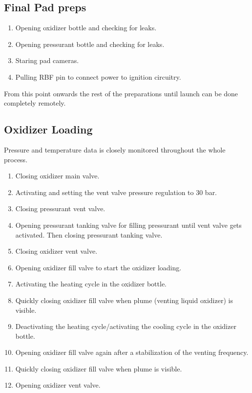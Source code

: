\subsection{Final Pad preps}
\begin{enumerate}
\item Opening oxidizer bottle and checking for leaks.
\item Opening pressurant bottle and checking for leaks.
\item Staring pad cameras.
\item Pulling RBF pin to connect power to ignition circuitry.
\end{enumerate}

From this point onwards the rest of the preparations until launch can be done completely remotely. 

\subsection{Oxidizer Loading}
\label{sec:oxidizer_loading}
Pressure and temperature data is closely monitored throughout the whole process.
\begin{enumerate}
\item Closing oxidizer main valve.
\item Activating and setting the vent valve pressure regulation to 30 bar.
\item Closing pressurant vent valve.
\item Opening pressurant tanking valve for filling pressurant until vent valve gets activated. Then closing pressurant tanking valve.
\item Closing oxidizer vent valve.
\item Opening oxidizer fill valve to start the oxidizer loading.
\item Activating the heating cycle in the oxidizer bottle.
\item Quickly closing oxidizer fill valve when plume (venting liquid oxidizer) is visible.
\item Deactivating the heating cycle/activating the cooling cycle in the oxidizer bottle.
\item Opening oxidizer fill valve again after a stabilization of the venting frequency.
\item Quickly closing oxidizer fill valve when plume is visible. 
\item Opening oxidizer vent valve.
\end{enumerate}

